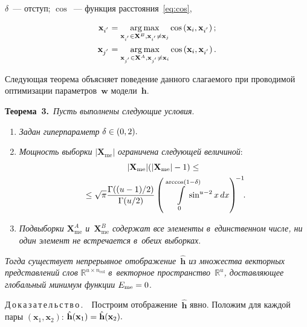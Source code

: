 \begin{multicols}{2}
\vspace*{-2pt}

\noindent
$\delta$~--- отступ; $\cos$~--- функция расстояния~\eqref{eq:cos}, 

\noindent
\begin{align*}
\mathbf{x}_{i^{'}}&=\mathop{\mathrm{arg}\,\mathrm{max}}\limits_{\mathbf{x}_{i^{'}} \in \mathbf{X}^B, 
\mathbf{x}_{i^{'}} \neq \mathbf{x}_{j}}\cos\left(\mathbf{x}_i, 
\mathbf{x}_{i^{'}}\right);
\\
\mathbf{x}_{j^{'}}&=\mathop{\mathrm{arg}\,\mathrm{max}}\limits_{\mathbf{x}_{j^{'}} \in \mathbf{X}^A, 
\mathbf{x}_{j^{'}} \neq \mathbf{x}_{i}}\cos\left(\mathbf{x}_i, 
\mathbf{x}_{i^{'}}\right).
\end{align*}

Следующая теорема объясняет поведение данного слагаемого при проводимой 
оптимизации параметров~$\mathbf{w}$ модели~$\mathbf{h}$.

\smallskip

\noindent
\textbf{Теорема~3.}\ 
\textit{Пусть выполнены следующие условия}.
\begin{enumerate}
\item \textit{Задан гиперпараметр} $\delta \hm\in (0, 2).$
\item \textit{Мощность выборки} $|\mathbf{X}_{\mathrm{me}}|$ \textit{ограничена следующей величиной}:
\begin{multline}
    |\mathbf{X}_{\mathrm{me}}|(|\mathbf{X}_{\mathrm{me}}|-1)  \leq{}\\
    \hspace*{-3pt}{}\leq \sqrt{\pi} 
\fr{\Gamma((u-1)/2)}{\Gamma(u/2)} \left( \int\limits_{0}^{\arccos(1 - \delta)}\!\! \!\!\!\!\!\!
\sin^{u-2} x\, dx \right )^{\!-1}\!\!.\!\!
\label{eq:sphere_code}
\end{multline}
\item \textit{Подвыборки $\mathbf{X}^A_{\mathrm{me}}$ и~$\mathbf{X}^B_{\mathrm{me}}$ содержат все 
элементы в~единственном числе, ни один элемент не встречается в~обеих выборках}.
\end{enumerate}
\textit{Тогда существует непрерывное отображение~$\hat{\mathbf{h}}$ из множества 
векторных представлений слов} $\mathbb{R}^{u \times n_{\mathrm{col}}}$
\textit{в~векторное 
пространство~$\mathbb{R}^{u}$, доставляющее глобальный минимум функции} $E_{\mathrm{me}} \hm= 
0$.

\pagebreak

\noindent
Д\,о\,к\,а\,з\,а\,т\,е\,л\,ь\,с\,т\,в\,о\,.\ \
Построим отображение~$\hat{\mathbf{h}}$ явно.
Положим для каждой пары $(\mathbf{x}_1, \mathbf{x}_2)$: 
$\hat{\mathbf{h}}(\mathbf{x}_1) \hm= \hat{\mathbf{h}}(\mathbf{x}_2).$


\end{multicols}

